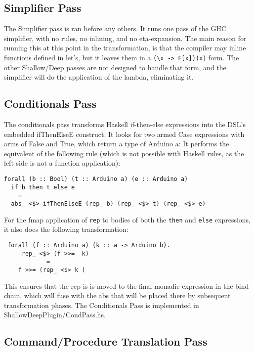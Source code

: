 \documentclass[11pt, oneside]{article}   	%
\begin{document}
\subsection{Simplifier Pass}

The Simplifier pass is ran before any others.  It runs one pass of the GHC simplifier,
with no rules, no inlining, and no eta-expansion.  The main reason for running
this at this point in the transformation, is that the compiler may inline functions
defined in let's, but it leaves them in a \verb+(\x -> F[x])(x)+ form.  The other Shallow/Deep
passes are not designed to handle that form, and the simplifier will do the application
of the lambda, eliminating it.

\subsection{Conditionals Pass}

The conditionals pass transforms Haskell if-then-else expressions into the DSL's
embedded ifThenElseE construct.  It looks for two armed Case expressions with
arms of False and True, which return a type of Arduino a:  It performs the equivalent
of the following rule (which is not possible with Haskell rules, as the left side is not
a function application):

\begin{verbatim}
forall (b :: Bool) (t :: Arduino a) (e :: Arduino a)
  if b then t else e
    =
  abs_ <$> ifThenElseE (rep_ b) (rep_ <$> t) (rep_ <$> e)
\end{verbatim}

For the fmap application of \verb+rep+ to bodies of both the \verb+then+ and
\verb+else+ expressions, it also does the following transformation:

\begin{verbatim}
 forall (f :: Arduino a) (k :: a -> Arduino b).
     rep_ <$> (f >>=  k)
            =
    f >>= (rep_ <$> k )
\end{verbatim}

This ensures that the rep is is moved to the final monadic expression in the bind chain,
which will fuse with the abs that will be placed there by subsequent transformation
phases.
The Conditionals Pass is implemented in ShallowDeepPlugin/CondPass.hs.

\subsection{Command/Procedure Translation Pass}
\end{document}
